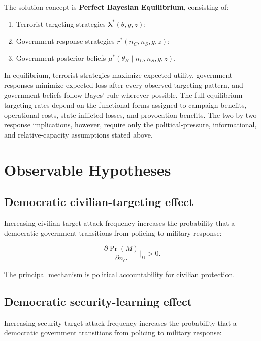 \documentclass[
  letterpaper,
  DIV=11,
  numbers=noendperiod]{scrartcl}
\providecommand{\tightlist}{%
  \setlength{\itemsep}{0pt}\setlength{\parskip}{0pt}}
\begin{document}
The solution concept is \textbf{Perfect Bayesian Equilibrium},
consisting of:

\begin{enumerate}
\def\labelenumi{\arabic{enumi}.}
\tightlist
\item
  Terrorist targeting strategies \(\boldsymbol{\lambda}^*(\theta,g,z)\);
\item
  Government response strategies \(r^*(n_C,n_S,g,z)\);
\item
  Government posterior beliefs \(\mu^*(\theta_H\mid n_C,n_S,g,z)\).
\end{enumerate}

In equilibrium, terrorist strategies maximize expected utility,
government responses minimize expected loss after every observed
targeting pattern, and government beliefs follow Bayes' rule wherever
possible. The full equilibrium targeting rates depend on the functional
forms assigned to campaign benefits, operational costs, state-inflicted
losses, and provocation benefits. The two-by-two response implications,
however, require only the political-pressure, informational, and
relative-capacity assumptions stated above.

\section{Observable Hypotheses}\label{observable-hypotheses}

\subsection{Democratic civilian-targeting
effect}\label{democratic-civilian-targeting-effect}

Increasing civilian-target attack frequency increases the probability
that a democratic government transitions from policing to military
response:

\[
\boxed{
\frac{\partial\Pr(M)}{\partial n_C}\bigg|_D>0.
}
\]

The principal mechanism is political accountability for civilian
protection.

\subsection{Democratic security-learning
effect}\label{democratic-security-learning-effect}

Increasing security-target attack frequency increases the probability
that a democratic government transitions from policing to military
response:
\end{document}
